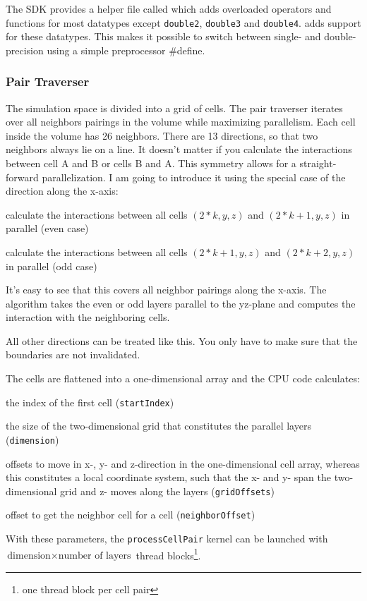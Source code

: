 \subsubsection{}
The \cuda{} SDK provides a helper file called  which adds overloaded operators and functions for most \cuda{} datatypes except \lstinline!double2!, \lstinline!double3! and \lstinline!double4!.
 adds support for these datatypes.
This makes it possible to switch between single- and double-precision using a simple preprocessor \#define.

\subsubsection{Pair Traverser}
The simulation space is divided into a grid of cells.  The pair traverser iterates over all neighbors pairings in the volume while maximizing parallelism. Each cell inside the volume has 26 neighbors. There are 13 directions, so that two neighbors always lie on a line. It doesn't matter if you calculate the interactions between cell A and B or cells B and A. This symmetry allows for a straight-forward parallelization.
I am going to introduce it using the special case of the direction along the x-axis:
\begin{compactenum}
\item calculate the interactions between all cells $ \left ( 2*k, y, z \right ) $ and $ \left ( 2*k + 1, y, z \right ) $ in parallel (even case)
\item calculate the interactions between all cells $ \left ( 2*k + 1, y, z \right ) $ and $ \left ( 2*k + 2, y, z \right ) $ in parallel (odd case)
\end{compactenum}
It's easy to see that this covers all neighbor pairings along the x-axis. 
The algorithm takes the even or odd layers parallel to the yz-plane and computes the interaction with the neighboring cells.

All other directions can be treated like this. You only have to make sure that the boundaries are not invalidated.

The cells are flattened into a one-dimensional array and the CPU code calculates:
\begin{compactitem}
\item the index of the first cell (\lstinline!startIndex!)
\item the size of the two-dimensional grid that constitutes the parallel layers (\lstinline!dimension!)
\item offsets to move in x-, y- and z-direction in the one-dimensional cell array, whereas this constitutes a local coordinate system, such that the x- and y- span the two-dimensional grid and z- moves along the layers (\lstinline!gridOffsets!)
\item offset to get the neighbor cell for a cell (\lstinline!neighborOffset!)
\end{compactitem}
With these parameters, the \lstinline!processCellPair! kernel can be launched with $ \text{dimension} \times     \text{number of layers} $ thread blocks\footnote{one thread block per cell pair}.

